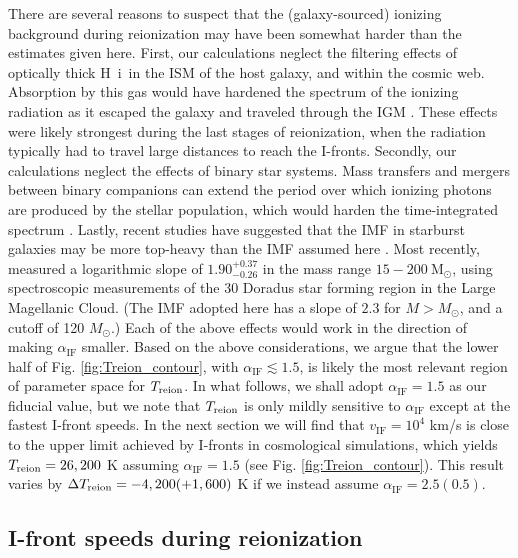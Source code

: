 \documentclass[twocolumn]{aastex62}
\newcommand{\HI}{H{\sc~i}}
\newcommand{\Treion}{T_{\rm reion}}
\newcommand{\vIF}{v_{\mathrm{IF}}}
\newcommand{\spec}{\alpha_{\mathrm{IF}}}
\begin{document}
There are several reasons to suspect that the (galaxy-sourced) ionizing background during reionization may have been somewhat harder than the estimates given here.   First, our calculations neglect the filtering effects of optically thick \HI\ in the ISM of the host galaxy, and within the cosmic web.  Absorption by this gas would have hardened the spectrum of the ionizing radiation as it escaped the galaxy and traveled through the IGM \citep[e.g.][]{1995ApJ...441...18M, 2009ApJ...703.1416F, 2012ApJ...746..125H}. These effects were likely strongest during the last stages of reionization, when the radiation typically had to travel large distances to reach the I-fronts.   Secondly, our calculations neglect the effects of binary star systems.  Mass transfers and mergers between binary companions can extend the period over which ionizing photons are produced by the stellar population, which would harden the time-integrated spectrum \citep{2009MNRAS.400.1019E,2016MNRAS.456..485S}.  Lastly, recent studies have suggested that the IMF in starburst galaxies may be more top-heavy than the IMF assumed here \citep{2005MNRAS.356.1191B,2011MNRAS.415.1647G,2012MNRAS.422.2246M, 2018Natur.558..260Z}.  Most recently, \citet{2018Sci...359...69S} measured a logarithmic slope of $1.90^{+0.37}_{-0.26}$ in the mass range $15-200~\mathrm{M}_{\odot}$, using spectroscopic measurements of the 30 Doradus star forming region in the Large Magellanic Cloud.  (The IMF adopted here has a slope of $2.3$ for $M> M_{\odot}$, and a cutoff of 120 $M_{\odot}$.)  Each of the above effects would work in the direction of making $\spec$ smaller.  Based on the above considerations, we argue that the lower half of Fig. \ref{fig:Treion_contour}, with $\spec \lesssim 1.5$, is likely the most relevant region of parameter space for $\Treion$.  In what follows, we shall adopt $\spec = 1.5$ as our fiducial value, but we note that $\Treion$ is only mildly sensitive to $\spec$ except at the fastest I-front speeds.  In the next section we will find that $\vIF = 10^4$ km/s is close to the upper limit achieved by I-fronts in cosmological simulations, which yields $\Treion = 26,200$ K assuming $\spec=1.5$ (see Fig. \ref{fig:Treion_contour}).  This result varies by $\Delta \Treion = -4,200(+1,600)$ K if we instead assume $\spec=2.5(0.5)$.     

\vspace{5cm}

\subsection{I-front speeds during reionization}
\label{sec:velocities}
\end{document}
